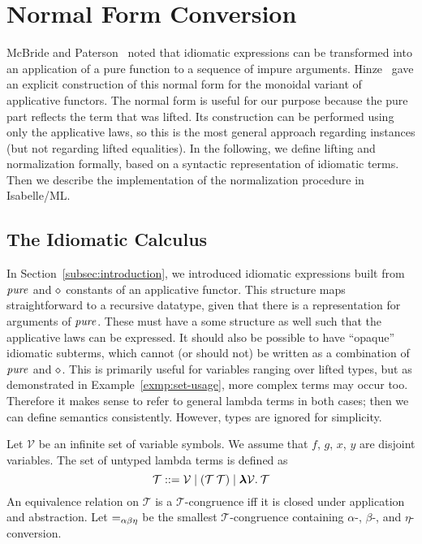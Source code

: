 \section{Normal Form Conversion}\label{sec:normal-form}

McBride and Paterson~\cite{mcbride08} noted that idiomatic expressions can
be transformed into an application of a pure function to a sequence of impure
arguments.
Hinze~\cite{hinze10} gave an explicit construction of this normal form for the
monoidal variant of applicative functors.
The normal form is useful for our purpose because the pure part reflects the
term that was lifted.
Its construction can be performed using only the applicative laws, so this is
the most general approach regarding instances (but not regarding lifted
equalities).
In the following, we define lifting and normalization formally, based on a
syntactic representation of idiomatic terms.
Then we describe the implementation of the normalization procedure in
Isabelle/ML.

\subsection{The Idiomatic Calculus}\label{subsec:idiomatic-calculus}

In Section~\ref{subsec:introduction}, we introduced idiomatic expressions built
from $\operatorname{\mathit{pure}}$ and $\diamond$ constants of an applicative functor.
This structure maps straightforward to a recursive datatype, given that there
is a representation for arguments of $\operatorname{\mathit{pure}}$.
These must have a some structure as well such that the applicative laws can
be expressed.
It should also be possible to have ``opaque'' idiomatic subterms, which cannot
(or should not) be written as a combination of $\operatorname{\mathit{pure}}$ and $\diamond$.
This is primarily useful for variables ranging over lifted types, but as
demonstrated in Example~\ref{exmp:set-usage}, more complex terms may occur too.
Therefore it makes sense to refer to general lambda terms in both cases;
then we can define semantics consistently.
However, types are ignored for simplicity.

\begin{definition}
Let $\mathcal{V}$ be an infinite set of variable symbols.
We assume that $f$, $g$, $x$, $y$ are disjoint variables.
The set of untyped lambda terms is defined as
\begin{equation}
	\mathcal{T} ::= \mathcal{V} \mid (\mathcal{T} \> \mathcal{T}) \mid
		{\boldsymbol\lambda} \mathcal{V}.\>\mathcal{T}
\end{equation}
An equivalence relation on $\mathcal{T}$ is a $\mathcal{T}$-congruence iff it
is closed under application and abstraction.
Let $=_{\alpha\beta\eta}$ be the smallest $\mathcal{T}$-congruence containing $\alpha$-,
$\beta$-, and $\eta$-conversion.
\end{definition}

